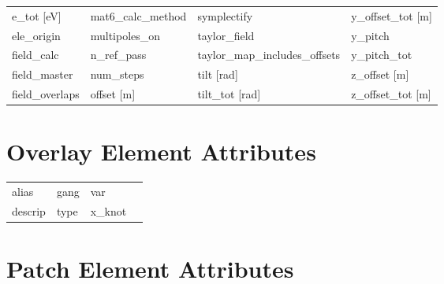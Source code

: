 \begin{tabular}{llll}
e_tot [eV]                     & mat6_calc_method               & symplectify                    & y_offset_tot [m]               \\
ele_origin                     & multipoles_on                  & taylor_field                   & y_pitch                        \\
field_calc                     & n_ref_pass                     & taylor_map_includes_offsets    & y_pitch_tot                    \\
field_master                   & num_steps                      & tilt [rad]                     & z_offset [m]                   \\
field_overlaps                 & offset [m]                     & tilt_tot [rad]                 & z_offset_tot [m]               \\
 \bottomrule
 \end{tabular}
 \vfill

 \section{Overlay Element Attributes}
 \label{s:list.overlay}

 \begin{tabular}{llll} \toprule
alias                          & gang                           & var                            &                                \\
descrip                        & type                           & x_knot                         &                                \\
 \bottomrule
 \end{tabular}
 \vfill

 \section{Patch Element Attributes}
 \label{s:list.patch}

